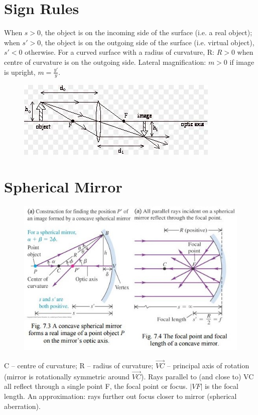 \documentclass[a4paper, 11pt, normalem]{report}
\begin{document}
\section{Sign Rules}
When $s > 0$, the object is on the incoming side of the surface (i.e. a real object); when $s' > 0$, the object is on the outgoing side of the surface (i.e. virtual object), $s' < 0$ otherwise.
For a curved surface with a radius of curvature, R: $R > 0$ when centre of curvature is on the outgoing side.
Lateral magnification: $m > 0$ if image is upright, $m = \frac{y'}{y}$.
\begin{figure}[H]
    \centering
    \includegraphics{Lats.jpg}
\end{figure}

\section{Spherical Mirror}
\begin{figure}[H]
    \centering
    \includegraphics{Mirrors.jpg} 
\end{figure}
C -- centre of curvature; R -- radius of curvature; $\overrightarrow{VC}$ -- principal axis of rotation (mirror is rotationally symmetric around $\overrightarrow{VC}$).
Rays parallel to (and close to) VC all reflect through a single point F, the focal point or focus.
$|VF|$ is the focal length.
An approximation: rays further out focus closer to mirror (spherical aberration).
\end{document}
